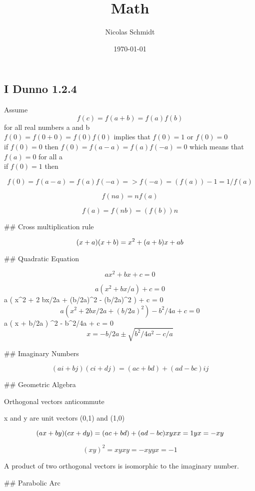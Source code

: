 \documentclass{article}
\begin{document}
\title{Math}
\author{Nicolas Schmidt}
\date{\today}
\maketitle

\subsection*{I Dunno 1.2.4}


Assume $$ f(c)=f(a+b) = f(a)f(b) $$ for all real numbers a and b\\

$ f(0)=f(0+0) = f(0)f(0) $ implies that $ f(0) = 1 $ or $f(0)=0$\\

if $f(0) = 0$ then $f(0) = f(a-a) = f(a)f(-a) = 0$ which means that $f(a) = 0$ for all a \\

if $f(0) = 1$ then 

$$f(0) = f(a-a) = f(a)f(-a) => f(-a) = (f(a))-1 = 1/f(a) $$

$$f(na)=nf(a)$$

$$f(a)=f(nb) = (f(b))n$$

## Cross multiplication rule

$$(x+a)(x+b) = x^2 + (a+b)x + ab \\
$$

## Quadratic Equation

$$ax^2 + bx + c = 0 $$

$$ a ( x^2 + bx/a ) + c = 0 $$
a ( x^2 + 2 bx/2a + (b/2a)^2  - (b/2a)^2  ) + c = 0$$
a ( x^2 + 2 bx/2a + (b/2a)^2   ) - b^2/4a + c = 0$$
a ( x + b/2a ) ^2 - b^2/4a + c = 0$$
x = -b/2a \pm \sqrt{ b^2/4a^2 - c/a }$$

## Imaginary Numbers

$$(ai + bj) ( ci + dj ) = (ac + bd) + (ad -bc) ij$$

## Geometric Algebra

Orthogonal vectors anticommute

x and y are unit vectors (0,1) and (1,0)

$$(ax+by)(cx+dy) = (ac+bd) + (ad-bc)xy \\
xx=1\\
yx=-xy$$

$$(xy)^2 = xyxy = -xyyx = -1$$

A product of two orthogonal vectors is isomorphic to the imaginary number.

## Parabolic Arc
\end{document}

